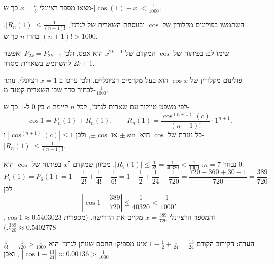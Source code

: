 
\begin{question}
מצאו מספר רציונלי $x=\frac ab$ כך ש-$|\cos(1)-x|<\frac{1}{1000}$.
\end{question}

\begin{hint}
השתמשו בפולינום מקלורין של $\cos$ ובנוסחת השארית של לגרנז', $|R_n(1)|\le\frac{1}{(n+1)!}$. בחרו $n$ כך ש-$(n+1)!>1000$.
\end{hint}

\begin{hint}
שימו לב: בפיתוח של $\cos$ המקדם של $x^{2k+1}$ הוא אפס, ולכן $P_{2k}=P_{2k+1}$ ואפשר להשתמש בשארית מסדר $2k+1$.
\end{hint}

\begin{solution}
פולינום מקלורין של $\cos x$ הוא בעל מקדמים רציונליים, ולכן ערכו ב-$x=1$ רציונלי. נותר לבחור סדר שבו השארית קטנה מ-$\frac1{1000}$.

לפי משפט טיילור עם שארית לגרנז', לכל $n$ קיימת $c$ בין $0$ ל-$1$ כך ש-
\[ \cos1=P_n(1)+R_n(1),\qquad R_n(1)=\frac{\cos^{(n+1)}(c)}{(n+1)!}\cdot1^{n+1}. \]
כל נגזרת של $\cos$ היא $\pm\sin$ או $\pm\cos$, ולכן $|\cos^{(n+1)}(c)|\le1$ ו-$|R_n(1)|\le\frac1{(n+1)!}$.

נבחר $n=7$: $|R_7(1)|\le\frac1{8!}=\frac1{40320}<\frac1{1000}$. מכיוון שמקדם $x^7$ בפיתוח של $\cos$ הוא $0$:
\[ P_7(1)=P_6(1)=1-\frac1{2!}+\frac1{4!}-\frac1{6!}=1-\frac12+\frac1{24}-\frac1{720}=\frac{720-360+30-1}{720}=\frac{389}{720}. \]
לכן
\[ \left|\cos1-\frac{389}{720}\right|\le\frac1{40320}<\frac1{1000}, \]
והמספר הרציונלי $\boxed{x=\frac{389}{720}}$ מקיים את הדרישה. (מספרית $\cos1\approx0.5403023$, $\frac{389}{720}\approx0.5402778$.)

\textbf{הערה:} הקירוב הקודם $1-\frac12+\frac1{24}=\frac{13}{24}$ \emph{אינו} מספיק: החסם שנותן לגרנז' הוא $\frac1{6!}=\frac1{720}>\frac1{1000}$, ואכן $|\cos1-\frac{13}{24}|\approx0.00136>\frac1{1000}$.
\end{solution}
